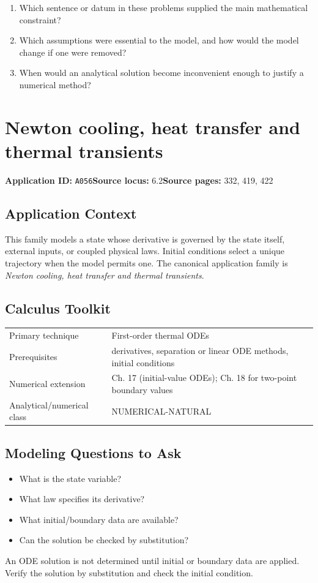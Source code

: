 \documentclass[11pt]{book}
\newcommand{\pid}[1]{\texttt{#1}}
\begin{document}
\begin{reflectionbox}\begin{enumerate}
\item Which sentence or datum in these problems supplied the main mathematical constraint?
\item Which assumptions were essential to the model, and how would the model change if one were removed?
\item When would an analytical solution become inconvenient enough to justify a numerical method?
\end{enumerate}\end{reflectionbox}
\chapter{Newton cooling, heat transfer and thermal transients}\label{app:A056}
\textbf{Application ID:} \pid{A056}\quad \textbf{Source locus:} 6.2\quad \textbf{Source pages:} 332, 419, 422
\section*{Application Context}
This family models a state whose derivative is governed by the state itself, external inputs, or coupled physical laws. Initial conditions select a unique trajectory when the model permits one. The canonical application family is \emph{Newton cooling, heat transfer and thermal transients}.
\section*{Calculus Toolkit}
\begin{tabularx}{\textwidth}{@{}lX@{}}\toprule
Primary technique & First-order thermal ODEs \\
Prerequisites & derivatives, separation or linear ODE methods, initial conditions \\
Numerical extension & Ch. 17 (initial-value ODEs); Ch. 18 for two-point boundary values \\
Analytical/numerical class & NUMERICAL-NATURAL \\
\bottomrule\end{tabularx}
\section*{Modeling Questions to Ask}\begin{itemize}
\item What is the state variable?
\item What law specifies its derivative?
\item What initial/boundary data are available?
\item Can the solution be checked by substitution?
\end{itemize}
\begin{errorbox}An ODE solution is not determined until initial or boundary data are applied. Verify the solution by substitution and check the initial condition.\end{errorbox}
\end{document}
